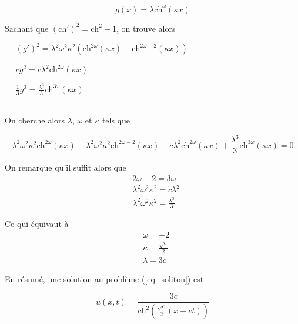 \documentclass[12pt,a4paper]{article}
\numberwithin{equation}{section}
\begin{document}
\begin{equation*}
     g(x) = \lambda\text{ch}^{\omega}(\kappa x)
\end{equation*}

Sachant que $(\text{ch}')^2 = \text{ch}^2 - 1$, on trouve alors
\begin{list}{}{}
    \item[\textbullet]~~ $(g')^2 = \lambda^2\omega^2\kappa^2\left( \text{ch}^{2\omega}(\kappa x) - \text{ch}^{2\omega-2}(\kappa x)\right)$
    \item[\textbullet]~~ $cg^2 = c \lambda^2\text{ch}^{2\omega}(\kappa x)$
    \item[\textbullet]~~ $\frac{1}{3}g^3 = \frac{\lambda^3}{3}\text{ch}^{3\omega}(\kappa x)$
    
\end{list}\,\\

On cherche alors $\lambda$, $\omega$ et $\kappa$ tels que

\begin{equation*}
    \lambda^2\omega^2\kappa^2 \text{ch}^{2\omega}(\kappa x) - \lambda^2\omega^2\kappa^2 \text{ch}^{2\omega-2}(\kappa x) - c \lambda^2\text{ch}^{2\omega}(\kappa x) + \frac{\lambda^3}{3}\text{ch}^{3\omega}(\kappa x) = 0
\end{equation*}

On remarque qu'il suffit alors que 
\begin{align*}
    & 2\omega - 2 = 3\omega\\
    &\lambda^2\omega^2\kappa^2= c\lambda^2 \\ 
    & \lambda^2\omega^2\kappa^2 = \frac{\lambda^3}{3}
\end{align*}

Ce qui équivaut à
\begin{align*}
    &\omega = -2\\
    &\kappa = \frac{\sqrt{c}}{2}\\
    &\lambda = 3c
\end{align*}

En résumé, une solution au problème (\ref{eq_soliton}) est

\begin{equation}
    u(x,t) = \frac{3c}{\text{ch}^2\left( \frac{\sqrt{c}}{2}(x-ct)\right)}
\end{equation}
\end{document}
